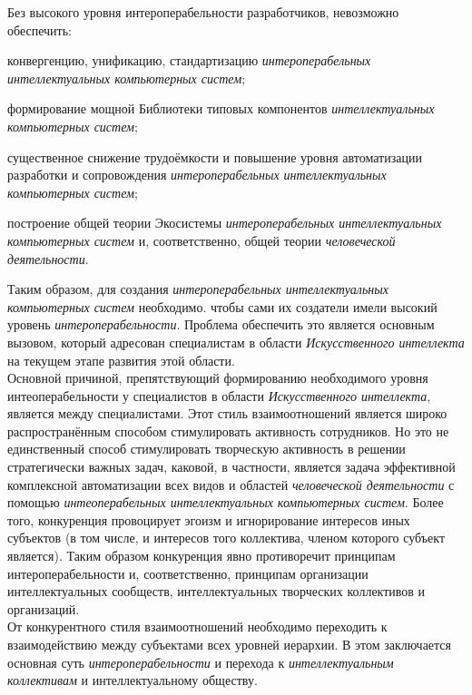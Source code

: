 \begin{textitemize}
	Без высокого уровня интероперабельности разработчиков, невозможно обеспечить:
	\begin{textitemize}
		\item конвергенцию, унификацию, стандартизацию \textit{интероперабельных интеллектуальных компьютерных систем};
		\item формирование мощной Библиотеки типовых компонентов \textit{интеллектуальных компьютерных систем};
		\item существенное снижение трудоёмкости и повышение уровня автоматизации разработки и сопровождения \textit{интероперабельных интеллектуальных компьютерных систем};
		\item построение общей теории Экосистемы \textit{интероперабельных интеллектуальных компьютерных систем} и, соответственно, общей теории \textit{человеческой деятельности}.
	\end{textitemize}

		Таким образом, для создания \textit{интероперабельных интеллектуальных компьютерных систем} необходимо. чтобы сами их создатели имели высокий уровень \textit{интероперабельности}. Проблема обеспечить это является основным вызовом, который адресован специалистам в области \textit{Искусственного интеллекта} на текущем этапе развития этой области.\\
		Основной причиной, препятствующий формированию необходимого уровня интеоперабельности у специалистов в области \textit{Искусственного интеллекта}, является  между специалистами. Этот стиль взаимоотношений является широко распространённым способом стимулировать активность сотрудников. Но это не единственный способ стимулировать творческую активность в решении стратегически важных задач, каковой, в частности, является задача эффективной комплексной автоматизации всех видов и областей \textit{человеческой деятельности} с помощью\textit{ интеоперабельных интеллектуальных компьютерных систем}. Более того, конкуренция провоцирует эгоизм и игнорирование интересов иных субъектов (в том числе, и интересов того коллектива, членом которого субъект является). Таким образом конкуренция явно противоречит принципам интероперабельности и, соответственно, принципам организации интеллектуальных сообществ, интеллектуальных творческих коллективов и организаций.\\
		От конкурентного стиля взаимоотношений необходимо переходить к  взаимодействию между субъектами всех уровней иерархии. В этом заключается основная суть \textit{интероперабельности} и перехода к \textit{интеллектуальным коллективам} и интеллектуальному обществу.
	\end{textitemize}

